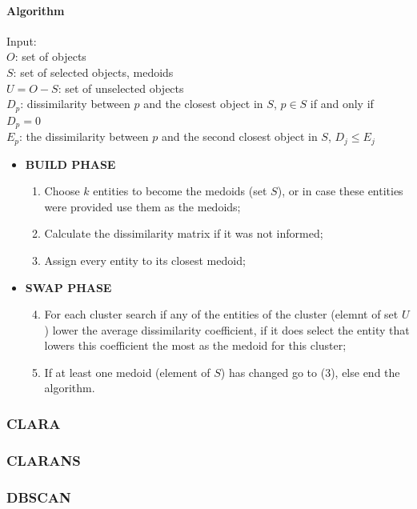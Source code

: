 \paragraph{Algorithm}
Input:\\
\(O\): set of objects\\
\(S\): set of selected objects, medoids\\
\(U = O - S\): set of unselected objects\\
\(D_p\): dissimilarity between \(p\) and the closest object in \(S\), \(p \in S\) if and only if \(D_p = 0\)\\
\(E_p\): the dissimilarity between \(p\) and the second closest object in \(S\), \(D_j \leq E_j\)
\begin{itemize}
    \item \textbf{BUILD PHASE}
    \begin{enumerate}
        \item Choose \(k\) entities to become the medoids (set \(S\)), or in case these entities were provided use them as the medoids;
        \item Calculate the dissimilarity matrix if it was not informed;
        \item Assign every entity to its closest medoid;
    \end{enumerate}
    \item \textbf{SWAP PHASE}
    \begin{enumerate}
        \setcounter{enumi}{3}
        \item For each cluster search if any of the entities of the cluster (elemnt of set \(U\)) lower the average dissimilarity coefficient, if it does select the entity that lowers this coefficient the most as the medoid for this cluster;
        \item If at least one medoid (element of \(S\)) has changed go to (3), else end the algorithm.
    \end{enumerate}
\end{itemize}
\subsubsection{CLARA}
\subsubsection{CLARANS}
\subsubsection{DBSCAN}